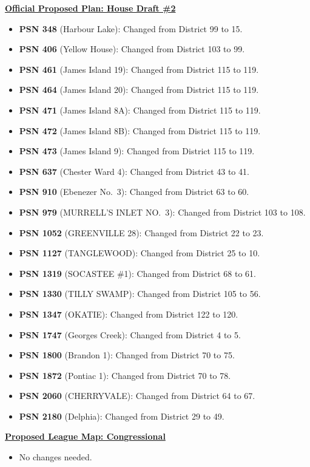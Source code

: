 \documentclass[11pt]{article}
\begin{document}
\underline{\textbf{Official Proposed Plan: House Draft \#2}}
\begin{itemize}
	\item \textbf{PSN 348} (Harbour Lake): Changed from District 99 to 15.
	\item \textbf{PSN 406} (Yellow House): Changed from District 103 to 99.
	\item \textbf{PSN 461} (James Island 19): Changed from District 115 to 119.
	\item \textbf{PSN 464} (James Island 20): Changed from District 115 to 119.
	\item \textbf{PSN 471} (James Island 8A): Changed from District 115 to 119.
	\item \textbf{PSN 472} (James Island 8B): Changed from District 115 to 119.
	\item \textbf{PSN 473} (James Island 9): Changed from District 115 to 119.
	\item \textbf{PSN 637} (Chester Ward 4): Changed from District 43 to 41.
	\item \textbf{PSN 910} (Ebenezer No.\ 3): Changed from District 63 to 60.
	\item \textbf{PSN 979} (MURRELL’S INLET NO.\ 3): Changed from District 103 to 108.
	\item \textbf{PSN 1052} (GREENVILLE 28): Changed from District 22 to 23.
	\item \textbf{PSN 1127} (TANGLEWOOD): Changed from District 25 to 10.
	\item \textbf{PSN 1319} (SOCASTEE \#1): Changed from District 68 to 61.
	\item \textbf{PSN 1330} (TILLY SWAMP): Changed from District 105 to 56.
	\item \textbf{PSN 1347} (OKATIE): Changed from District 122 to 120.
	\item \textbf{PSN 1747} (Georges Creek): Changed from District 4 to 5.
	\item \textbf{PSN 1800} (Brandon 1): Changed from District 70 to 75.
	\item \textbf{PSN 1872} (Pontiac 1): Changed from District 70 to 78.
	\item \textbf{PSN 2060} (CHERRYVALE): Changed from District 64 to 67.
	\item \textbf{PSN 2180} (Delphia): Changed from District 29 to 49.
\end{itemize}

\underline{\textbf{Proposed League Map: Congressional}}
\begin{itemize}
	\item No changes needed.
\end{itemize}
\end{document}
